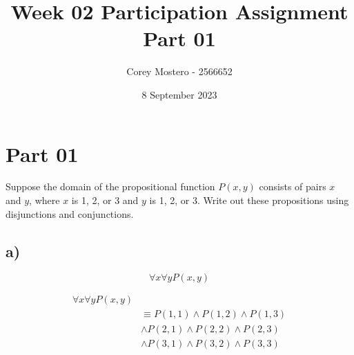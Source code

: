\documentclass{article}
\title{Week 02 Participation Assignment Part 01}
\author{Corey Mostero - 2566652}
\date{8 September 2023}
\begin{document}
\newcommand{\hr}{\par\noindent\rule{\textwidth}{0.4pt}}

\newcommand{\bc}[1]{
	\begin{equation*}
		\begin{boxed}
			{#1}
		\end{boxed}
	\end{equation*}
}

\newcommand{\cond}[2]{
	\ifmmode
		{#1} \quad {#2}
	\else
		$$ {#1} \quad {#2} $$
	\fi
}

\newcommand{\matr}[1]{
	\ifmmode \bm{#1}
	\else \textit{\textbf{#1}}
	\fi
}
\newcommand{\vect}[1]{
	\ifmmode \mathbf{#1}
	\else \textbf{#1}
	\fi
}


\maketitle
\newpage

\tableofcontents

\section{Part 01}

Suppose the domain of the propositional function $ P(x, y) $ consists of pairs $ x $ and $ y $, where $ x $ is 1, 2, or 3 and $ y $ is 1, 2, or 3. Write out these propositions using disjunctions and conjunctions.

\subsection{a)}
\begin{equation*}
	\forall x \forall y P(x, y)
\end{equation*}

\begin{align*}
	\forall x \forall y P(x, y) & \\
								& \equiv P(1, 1) \land P(1, 2) \land P(1, 3) \\
								& \land P(2, 1) \land P(2, 2) \land P(2, 3) \\
								& \land P(3, 1) \land P(3, 2) \land P(3, 3)
\end{align*}
\end{document}

